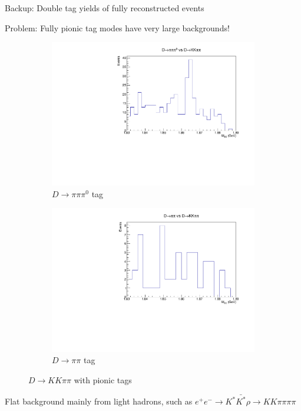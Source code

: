 \documentclass{beamer}
\begin{document}
\begin{frame}{Backup: Double tag yields of fully reconstructed events}
  \begin{center}
    Problem: Fully pionic tag modes have very large backgrounds!
  \end{center}
  \begin{figure}
    \centering
    \begin{subfigure}{0.4\textwidth}
      \includegraphics[width = 1.0\textwidth]{Plots/pipipi0_MBC.pdf}
      \caption{$D\to\pi\pi\pi^0$ tag}
    \end{subfigure}%
    \begin{subfigure}{0.4\textwidth}
      \includegraphics[width = 1.0\textwidth]{Plots/pipi_MBC.pdf}
      \caption{$D\to\pi\pi$ tag}
    \end{subfigure}
    \caption{$D\to KK\pi\pi$ with pionic tags}
  \end{figure}
  \begin{center}
    Flat background mainly from light hadrons, such as $e^+e^-\to K^*\bar{K^*}\rho\to KK\pi\pi\pi\pi$
  \end{center}
\end{frame}
\end{document}
